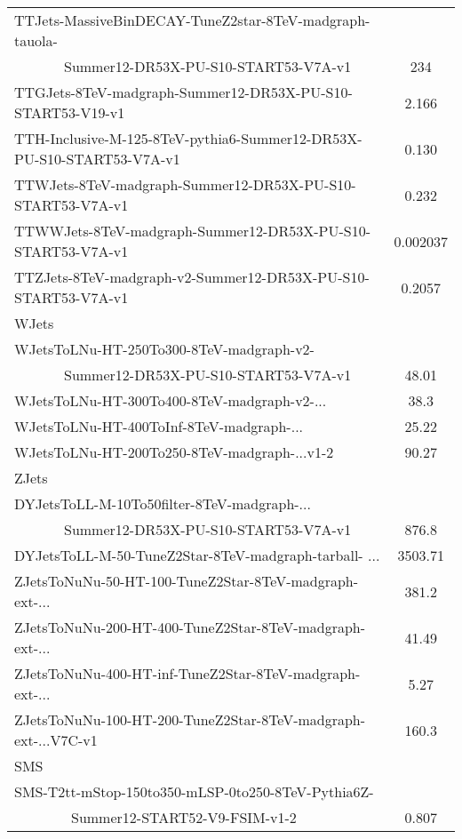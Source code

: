 \begin{table}[!htb]
\begin{center}
\begin{tabular}{|l|c|}
TTJets-MassiveBinDECAY-TuneZ2star-8TeV-madgraph-tauola- & \\
~~~~~~~Summer12-DR53X-PU-S10-START53-V7A-v1                & 234\\
TTGJets-8TeV-madgraph-Summer12-DR53X-PU-S10-START53-V19-v1 & 2.166\\
TTH-Inclusive-M-125-8TeV-pythia6-Summer12-DR53X-PU-S10-START53-V7A-v1 &	0.130\\
TTWJets-8TeV-madgraph-Summer12-DR53X-PU-S10-START53-V7A-v1 & 0.232\\
TTWWJets-8TeV-madgraph-Summer12-DR53X-PU-S10-START53-V7A-v1 & 0.002037\\
TTZJets-8TeV-madgraph-v2-Summer12-DR53X-PU-S10-START53-V7A-v1 & 0.2057\\\hline

WJets& \\\hline
WJetsToLNu-HT-250To300-8TeV-madgraph-v2- & \\
~~~~~~~Summer12-DR53X-PU-S10-START53-V7A-v1   & 48.01 \\
WJetsToLNu-HT-300To400-8TeV-madgraph-v2-...                                    & 38.3  \\
WJetsToLNu-HT-400ToInf-8TeV-madgraph-...                                       & 25.22 \\
WJetsToLNu-HT-200To250-8TeV-madgraph-...v1-2                                   & 90.27 \\\hline

ZJets & \\\hline
DYJetsToLL-M-10To50filter-8TeV-madgraph-... & \\
~~~~~~~Summer12-DR53X-PU-S10-START53-V7A-v1             & 876.8\\
DYJetsToLL-M-50-TuneZ2Star-8TeV-madgraph-tarball-  ...              & 3503.71\\
ZJetsToNuNu-50-HT-100-TuneZ2Star-8TeV-madgraph-ext-...              & 381.2\\
ZJetsToNuNu-200-HT-400-TuneZ2Star-8TeV-madgraph-ext-...             & 41.49\\
ZJetsToNuNu-400-HT-inf-TuneZ2Star-8TeV-madgraph-ext-...             & 5.27\\
ZJetsToNuNu-100-HT-200-TuneZ2Star-8TeV-madgraph-ext-...V7C-v1          & 160.3\\\hline

SMS & \\\hline
SMS-T2tt-mStop-150to350-mLSP-0to250-8TeV-Pythia6Z-\\
~~~~~~~~Summer12-START52-V9-FSIM-v1-2 & 0.807\\


\end{tabular}
\end{center}
\end{table}
